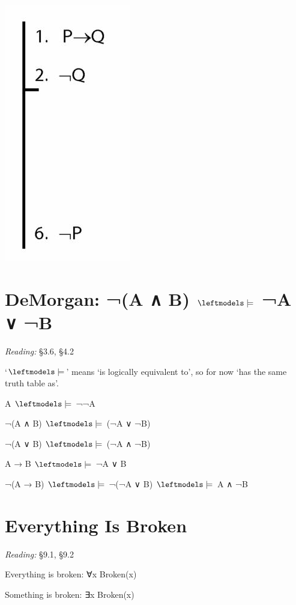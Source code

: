 \documentclass[12pt]{extarticle}
\begin{document}
\begin{multicols*}{3}
\begin{center}
\includegraphics[scale=0.3]{img/unit_283_proof.png}
\end{center}
 
\begin{minipage}{\columnwidth} 
\section{DeMorgan: ¬(A ∧ B) $\leftmodels\models$ ¬A ∨ ¬B}
 
\emph{Reading:} §3.6, §4.2
 
`$\leftmodels\models$' means `is logically equivalent to', so for now `has the same truth table as'.
 
A $\leftmodels\models$ ¬¬A
 
¬(A ∧ B) $\leftmodels\models$ (¬A ∨ ¬B)
 
¬(A ∨ B) $\leftmodels\models$ (¬A ∧ ¬B)
 
A → B $\leftmodels\models$ ¬A ∨ B
 
¬(A → B) $\leftmodels\models$ ¬(¬A ∨ B) $\leftmodels\models$ A ∧ ¬B
 
\end{minipage} 
 
\section{Everything Is Broken}
 
\emph{Reading:} §9.1, §9.2
 
Everything is broken: ∀x Broken(x)
 
Something is broken: ∃x Broken(x)
 
 


\end{multicols*}
\end{document}
